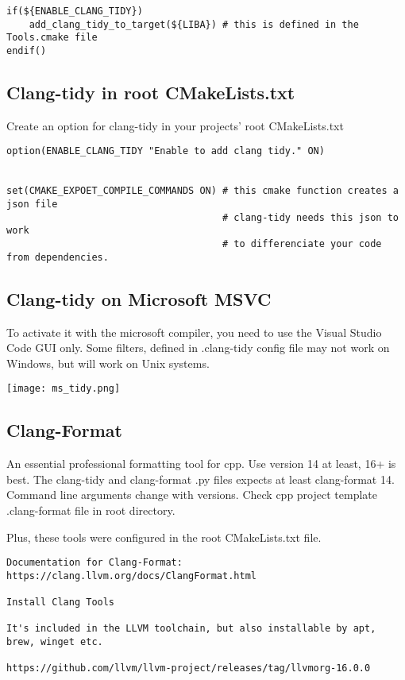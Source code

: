 \documentclass[openany]{report}
\begin{document}
\begin{verbatim}
if(${ENABLE_CLANG_TIDY})
    add_clang_tidy_to_target(${LIBA}) # this is defined in the Tools.cmake file
endif()
\end{verbatim}

\subsection{Clang-tidy in root CMakeLists.txt}

Create an option for clang-tidy in your projects' root CMakeLists.txt

\begin{verbatim}
option(ENABLE_CLANG_TIDY "Enable to add clang tidy." ON)


set(CMAKE_EXPOET_COMPILE_COMMANDS ON) # this cmake function creates a json file
                                      # clang-tidy needs this json to work
                                      # to differenciate your code from dependencies.

\end{verbatim}


\subsection{Clang-tidy on Microsoft MSVC}

To activate it with the microsoft compiler, you need to use the Visual Studio Code GUI only.
Some filters, defined in .clang-tidy config file may not work on Windows, but will work on Unix systems.

\begin{center}
    \texttt{[image: ms\_tidy.png]}
\end{center}

 
\subsection{Clang-Format}

An essential professional formatting tool for cpp. Use version 14 at least, 16+ is best. The 
clang-tidy and clang-format .py files expects at least clang-format 14. Command line arguments 
change with versions. Check cpp project template .clang-format file in root directory.

Plus, these tools were configured in the root CMakeLists.txt file.

\begin{verbatim}
Documentation for Clang-Format: https://clang.llvm.org/docs/ClangFormat.html

Install Clang Tools

It's included in the LLVM toolchain, but also installable by apt, brew, winget etc.

https://github.com/llvm/llvm-project/releases/tag/llvmorg-16.0.0
\end{verbatim}
\end{document}
